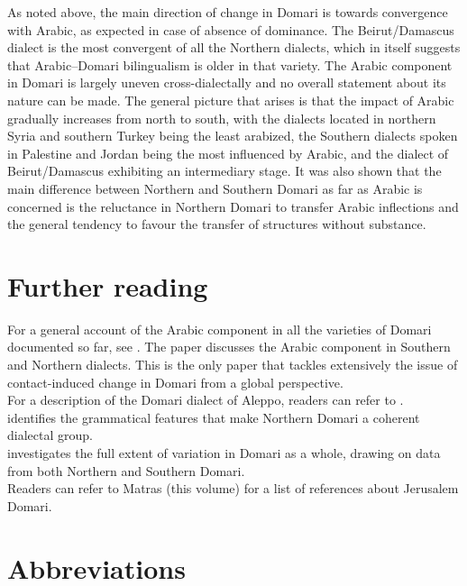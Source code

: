 \documentclass[output=paper]{langsci/langscibook}
\begin{document}
As noted above, the main direction of change in Domari is towards convergence with Arabic, as expected in case of absence of dominance. The Beirut/Damascus dialect is the most convergent of all the Northern dialects, which in itself suggests that Arabic--Domari bilingualism is older in that variety. The Arabic component in Domari is largely uneven cross-dialectally and no overall statement about its nature can be made. The general picture that arises is that the impact of Arabic gradually increases from north to south, with the dialects located in northern Syria and southern Turkey being the least arabized, the Southern dialects spoken in Palestine and Jordan being the most influenced by Arabic, and the dialect of Beirut/Damascus exhibiting an intermediary stage. It was also shown that the main difference between Northern and Southern Domari as far as Arabic is concerned is the reluctance in Northern Domari to transfer Arabic inflections and the general tendency to favour the transfer of structures without substance.

\section*{Further reading}

For a general account of the Arabic component in all the varieties of Domari documented so far, see \citet{Herin2018}. The paper discusses the Arabic component in Southern and Northern dialects. This is the only paper that tackles extensively the issue of contact-induced change in Domari from a global perspective.\\
For a description of the Domari dialect of Aleppo, readers can refer to \citet{Herin2012}.\\ \citet{Herin2014Domari} identifies the grammatical features that make Northern Domari a coherent dialectal group.\\ \citet{Herin2016} investigates the full extent of variation in Domari as a whole, drawing on data from both Northern and Southern Domari.\\ Readers can refer to Matras (this volume) for a list of references about Jerusalem Domari.

\section*{Abbreviations}
\end{document}
